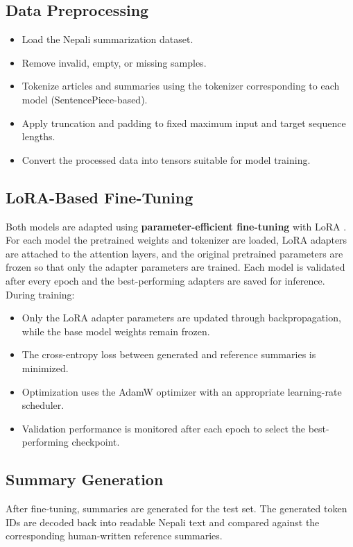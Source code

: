 \documentclass[12pt]{report}
\begin{document}
\subsection{Data Preprocessing}
\begin{itemize}
    \item Load the Nepali summarization dataset.
    \item Remove invalid, empty, or missing samples.
    \item Tokenize articles and summaries using the tokenizer corresponding to each model (SentencePiece-based).
    \item Apply truncation and padding to fixed maximum input and target sequence lengths.
    \item Convert the processed data into tensors suitable for model training.
\end{itemize}

\subsection{LoRA-Based Fine-Tuning}
Both models are adapted using \textbf{parameter-efficient fine-tuning} with LoRA \cite{hu2021lora}. For each model the pretrained weights and tokenizer are loaded, LoRA adapters are attached to the attention layers, and the original pretrained parameters are frozen so that only the adapter parameters are trained. Each model is validated after every epoch and the best-performing adapters are saved for inference. During training:
\begin{itemize}
    \item Only the LoRA adapter parameters are updated through backpropagation, while the base model weights remain frozen.
    \item The cross-entropy loss between generated and reference summaries is minimized.
    \item Optimization uses the AdamW optimizer with an appropriate learning-rate scheduler.
    \item Validation performance is monitored after each epoch to select the best-performing checkpoint.
\end{itemize}

\subsection{Summary Generation}
After fine-tuning, summaries are generated for the test set. The generated token IDs are decoded back into readable Nepali text and compared against the corresponding human-written reference summaries.
\end{document}
